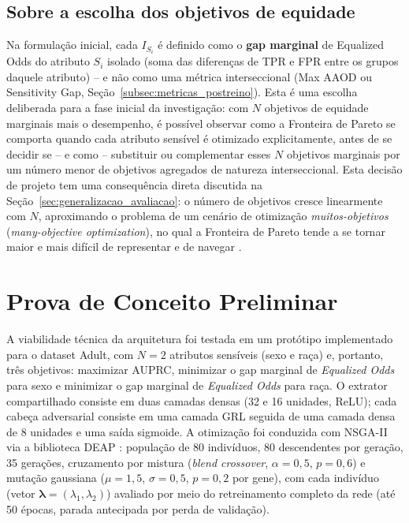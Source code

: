 \subsection*{Sobre a escolha dos objetivos de equidade}

Na formulação inicial, cada $I_{S_i}$ é definido como o \textbf{gap marginal} de Equalized Odds do atributo $S_i$ isolado (soma das diferenças de TPR e FPR entre os grupos daquele atributo) -- e não como uma métrica interseccional (Max AAOD ou Sensitivity Gap, Seção~\ref{subsec:metricas_postreino}). Esta é uma escolha deliberada para a fase inicial da investigação: com $N$ objetivos de equidade marginais mais o desempenho, é possível observar como a Fronteira de Pareto se comporta quando cada atributo sensível é otimizado explicitamente, antes de se decidir se -- e como -- substituir ou complementar esses $N$ objetivos marginais por um número menor de objetivos agregados de natureza interseccional. Esta decisão de projeto tem uma consequência direta discutida na Seção~\ref{sec:generalizacao_avaliacao}: o número de objetivos cresce linearmente com $N$, aproximando o problema de um cenário de otimização \textit{muitos-objetivos} (\textit{many-objective optimization}), no qual a Fronteira de Pareto tende a se tornar maior e mais difícil de representar e de navegar \citep{wagner2007pareto}.

\section{Prova de Conceito Preliminar}\label{sec:prova_conceito}

A viabilidade técnica da arquitetura foi testada em um protótipo implementado para o dataset Adult, com $N=2$ atributos sensíveis (sexo e raça) e, portanto, três objetivos: maximizar AUPRC, minimizar o gap marginal de \textit{Equalized Odds} para sexo e minimizar o gap marginal de \textit{Equalized Odds} para raça. O extrator compartilhado consiste em duas camadas densas (32 e 16 unidades, ReLU); cada cabeça adversarial consiste em uma camada GRL seguida de uma camada densa de 8 unidades e uma saída sigmoide. A otimização foi conduzida com NSGA-II via a biblioteca DEAP \citep{fortin2012deap}: população de 80 indivíduos, 80 descendentes por geração, 35 gerações, cruzamento por mistura (\textit{blend crossover}, $\alpha=0,5$, $p=0,6$) e mutação gaussiana ($\mu=1,5$, $\sigma=0,5$, $p=0,2$ por gene), com cada indivíduo (vetor $\boldsymbol{\lambda} = (\lambda_1, \lambda_2)$) avaliado por meio do retreinamento completo da rede (até 50 épocas, parada antecipada por perda de validação).

